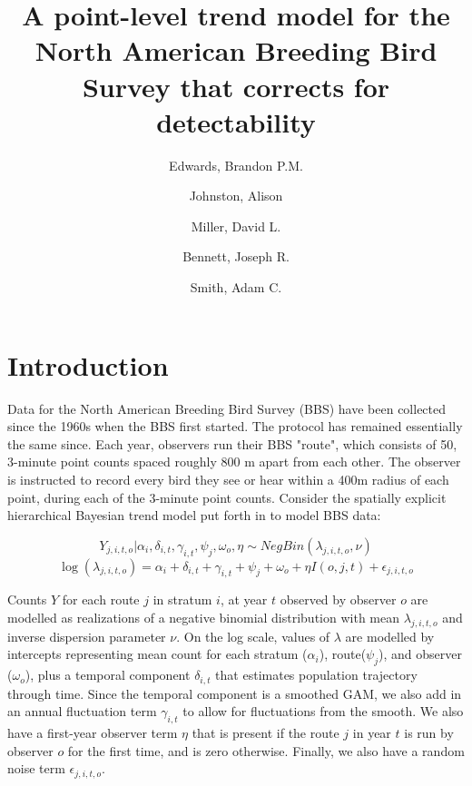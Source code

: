 \documentclass[12pt]{article}
\title{A point-level trend model for the North American Breeding Bird Survey that corrects for detectability}
\author{
	Edwards, Brandon P.M.\\
	\and
	Johnston, Alison\\
	\and
	Miller, David L.\\
	\and
	Bennett, Joseph R.\\
	\and
	Smith, Adam C.\\
}
\begin{document}
	
	\maketitle
	
		
	
\section{Introduction}
\par Data for the North American Breeding Bird Survey (BBS) have been collected since the 1960s when the BBS first started. The protocol has remained essentially the same since. Each year, observers run their BBS "route", which consists of 50, 3-minute point counts spaced roughly 800 m apart from each other. The observer is instructed to record every bird they see or hear within a 400m radius of each point, during each of the 3-minute point counts. Consider the spatially explicit hierarchical Bayesian trend model put forth in \citet{smith_spatially_2023} to model BBS data:

\begin{equation*}
	Y_{j,i,t,o} | \alpha_i, \delta_{i,t}, \gamma_{i,t}, \psi_j, \omega_o, \eta \sim NegBin(\lambda_{j,i,t,o}, \nu)
\end{equation*}
\begin{equation}\label{bbs}
\log(\lambda_{j,i,t,o}) = \alpha_i + \delta_{i,t} + \gamma_{i,t} + \psi_j + \omega_o + \eta I(o,j,t) + \epsilon_{j,i,t,o}
\end{equation}

\par Counts $Y$ for each route $j$ in stratum $i$, at year $t$ observed by observer $o$ are modelled as realizations of a negative binomial distribution with mean $\lambda_{j,i,t,o}$ and inverse dispersion parameter $\nu$. On the log scale, values of $\lambda$ are modelled by intercepts representing mean count for each stratum ($\alpha_i$), route($\psi_j$), and observer ($\omega_o$), plus a temporal component $\delta_{i,t}$ that estimates population trajectory through time. Since the temporal component is a smoothed GAM, we also add in an annual fluctuation term $\gamma_{i,t}$ to allow for fluctuations from the smooth. We also have a first-year observer term $\eta$ that is present if the route $j$ in year $t$ is run by observer $o$ for the first time, and is zero otherwise. Finally, we also have a random noise term $\epsilon_{j,i,t,o}$.
\end{document}
